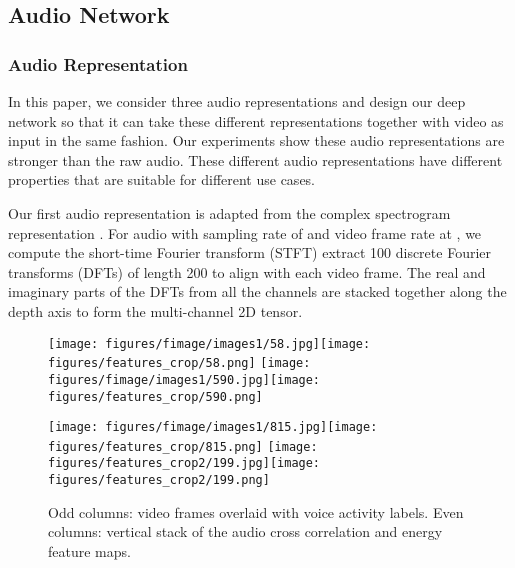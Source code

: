 \documentclass[10pt,twocolumn,letterpaper]{article}
\begin{document}
\subsection{Audio Network} \label{sec:audio-only}


\vspace{-5pt}
\subsubsection{Audio Representation}
\vspace{-5pt}
In this paper, we consider three audio representations and design our deep network so that
it can take these different representations together with video as input in the same fashion.
Our experiments show these audio representations are stronger than the raw audio. These different audio representations
have different properties that are suitable for different use cases.

Our first audio representation is adapted from the complex spectrogram representation \cite{wangaaai}.
For audio with sampling rate of  and video frame rate at , we compute the short-time Fourier
transform (STFT) extract 
100 discrete Fourier transforms (DFTs) of length 200 to align with each video frame. 
The real and imaginary parts of the DFTs from all the channels are stacked together
along the depth axis
to form the multi-channel 2D tensor. 

\begin{figure}[tb]
\centering
\texttt{[image: figures/fimage/images1/58.jpg]}\texttt{[image: figures/features\_crop/58.png]}\hspace{0.02em}
\texttt{[image: figures/fimage/images1/590.jpg]}\texttt{[image: figures/features\_crop/590.png]}

\vspace{0.15em}

\texttt{[image: figures/fimage/images1/815.jpg]}\texttt{[image: figures/features\_crop/815.png]}\hspace{0.02em}
\texttt{[image: figures/features\_crop2/199.jpg]}\texttt{[image: figures/features\_crop2/199.png]}\vspace{-5pt}
\caption{Odd columns: video frames overlaid with voice activity labels. 
Even columns: vertical stack of the
	audio cross correlation and energy feature maps.}
\vspace{-20pt}	
\label{fig:feature}
\end{figure}
\end{document}

